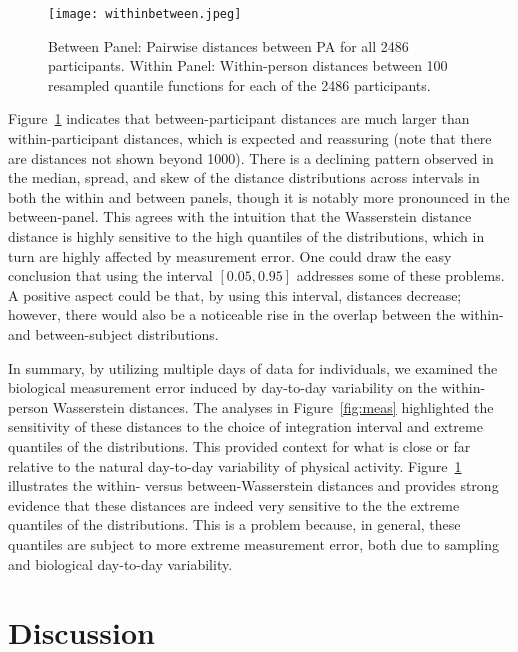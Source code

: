 \begin{figure}[H]
    \centering
    \texttt{[image: withinbetween.jpeg]}
    \caption{Between Panel: Pairwise distances between PA for all 2486 participants. Within Panel: Within-person distances between 100 resampled quantile functions for each of the 2486 participants.}
    \label{fig:withinbetween}
\end{figure}



Figure~\ref{fig:withinbetween} indicates that between-participant distances are much larger than within-participant distances, which is expected and reassuring (note that there are distances not shown beyond 1000). There is a declining pattern observed in the median, spread, and skew of the distance distributions across intervals in both the within and between panels, though it is notably more pronounced in the between-panel. This agrees with the intuition that the Wasserstein distance distance is highly sensitive to the high quantiles of the distributions, which in turn are highly affected by measurement error. One could draw the easy conclusion that using the interval $[0.05,0.95]$ addresses some of these problems. A positive aspect could be that, by using this interval, distances decrease; however, there would also be a noticeable rise in the overlap between the within- and between-subject distributions. 

In summary, by utilizing multiple days of data for individuals, we examined the biological measurement error induced by day-to-day variability on the within-person Wasserstein distances. The analyses in Figure~\ref{fig:meas} highlighted the sensitivity of these distances to the choice of integration interval and extreme quantiles of the distributions. This provided context for what is close or far relative to the natural day-to-day variability of physical activity. Figure~\ref{fig:withinbetween} illustrates the within- versus between-Wasserstein distances and provides strong evidence that these distances are indeed very sensitive to the the extreme quantiles of the distributions. This is a problem because, in general, these quantiles are subject to more extreme measurement error, both due to sampling and biological day-to-day variability. 



\section{Discussion}\label{sec:discussion}

